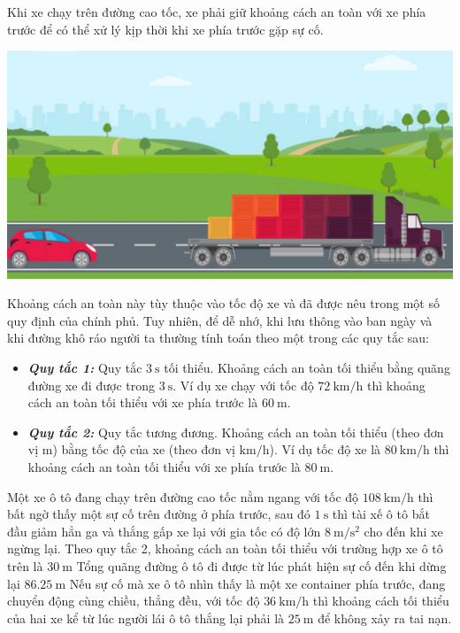\begin{ex}
	Khi xe chạy trên đường cao tốc, xe phải giữ khoảng cách an toàn với xe phía trước để có thể xử lý kịp thời khi xe phía trước gặp sự cố.
	\begin{center}
		\includegraphics[width=0.4\linewidth]{../figs/D10-1-4}
	\end{center}	
	Khoảng cách an toàn này tùy thuộc vào tốc độ xe và đã được nêu trong một số quy định của chính phủ. Tuy nhiên, để dễ nhớ, khi lưu thông vào ban ngày và khi đường khô ráo người ta thường tính toán theo một trong các quy tắc sau:
	\begin{itemize}
		\item \textbf{\textit{Quy tắc 1:}} Quy tắc $\SI{3}{\second}$  tối thiểu. Khoảng cách an toàn tối thiểu bằng quãng đường xe đi được trong $\SI{3}{\second}$. Ví dụ xe chạy với tốc độ $\SI{72}{\kilo\meter/\hour}$  thì khoảng cách an toàn tối thiểu với xe phía trước là $\SI{60}{\meter}$.
		\item \textbf{\textit{Quy tắc 2:}} Quy tắc tương đương. Khoảng cách an toàn tối thiểu (theo đơn vị $\si{\meter}$) bằng tốc độ của xe (theo đơn vị $\si{\kilo\meter/\hour}$). Ví dụ tốc độ xe là $\SI{80}{\kilo\meter/\hour}$  thì khoảng cách an toàn tối thiểu với xe phía trước là $\SI{80}{\meter}$.
	\end{itemize}
	Một xe ô tô đang chạy trên đường cao tốc nằm ngang với tốc độ $\SI{108}{\kilo\meter/\hour}$  thì bất ngờ thấy một sự cố trên đường ở phía trước, sau đó $\SI{1}{\second}$ thì tài xế ô tô bắt đầu giảm hẳn ga và thắng gấp xe lại với gia tốc có độ lớn $\SI{8}{\meter/\second^2}$ cho đến khi xe ngừng lại.
	{Theo quy tắc 2, khoảng cách an toàn tối thiểu với trường hợp xe ô tô trên là $\SI{30}{\meter}$}
	{\True Tổng quãng đường ô tô đi được từ lúc phát hiện sự cố đến khi dừng lại $\SI{86.25}{\meter}$}
	{\True Nếu sự cố mà xe ô tô nhìn thấy là một xe container phía trước, đang chuyển động cùng chiều, thẳng đều, với tốc độ $\SI{36}{\kilo\meter/\hour}$ thì khoảng cách tối thiểu của hai xe kể từ lúc người lái ô tô thắng lại phải là $\SI{25}{\meter}$ để không xảy ra tai nạn. }

\end{ex}
